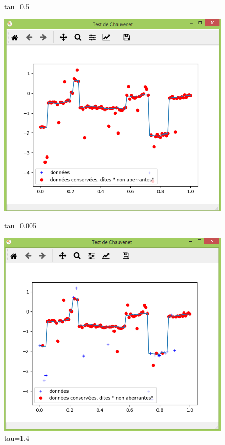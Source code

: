 \documentclass[11pt]{report}
\begin{document}
\begin{figure}[!htb]
\caption{tau=0.5} %
\label{coeff_05qua} %
\endminipage
{}%
\includegraphics[width=\linewidth]{nst005.PNG}  
\caption{tau=0.005}
\label{coeff_005qua}
\endminipage
{}%
\includegraphics[width=\linewidth]{nst14.PNG}  
\caption{tau=1.4}
\label{coeff_1.4qua}

\endminipage

\end{figure} 
\end{document}
